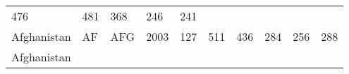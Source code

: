 \documentclass[]{article}
\begin{document}
\begin{longtable}[]{@{}llllllllll@{}}
\begin{minipage}[t]{0.09\columnwidth}
476\strut
\end{minipage} & \begin{minipage}[t]{0.09\columnwidth}\raggedright\strut
481\strut
\end{minipage} & \begin{minipage}[t]{0.09\columnwidth}\raggedright\strut
368\strut
\end{minipage} & \begin{minipage}[t]{0.09\columnwidth}\raggedright\strut
246\strut
\end{minipage} & \begin{minipage}[t]{0.09\columnwidth}\raggedright\strut
241\strut
\end{minipage}\tabularnewline
\begin{minipage}[t]{0.08\columnwidth}\raggedright\strut
Afghanistan\strut
\end{minipage} & \begin{minipage}[t]{0.04\columnwidth}\raggedright\strut
AF\strut
\end{minipage} & \begin{minipage}[t]{0.04\columnwidth}\raggedright\strut
AFG\strut
\end{minipage} & \begin{minipage}[t]{0.04\columnwidth}\raggedright\strut
2003\strut
\end{minipage} & \begin{minipage}[t]{0.08\columnwidth}\raggedright\strut
127\strut
\end{minipage} & \begin{minipage}[t]{0.09\columnwidth}\raggedright\strut
511\strut
\end{minipage} & \begin{minipage}[t]{0.09\columnwidth}\raggedright\strut
436\strut
\end{minipage} & \begin{minipage}[t]{0.09\columnwidth}\raggedright\strut
284\strut
\end{minipage} & \begin{minipage}[t]{0.09\columnwidth}\raggedright\strut
256\strut
\end{minipage} & \begin{minipage}[t]{0.09\columnwidth}\raggedright\strut
288\strut
\end{minipage}\tabularnewline
\begin{minipage}[t]{0.08\columnwidth}\raggedright\strut
Afghanistan\strut
\end{minipage} & \begin{minipage}[t]{0.04\columnwidth}\raggedright\strut

\end{minipage}
\end{longtable}
\end{document}
